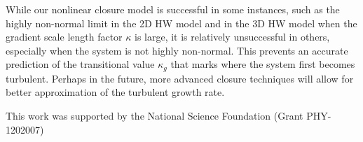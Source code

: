 \documentclass[twocolumn,showkeys,superscriptaddress]{revtex4}
\begin{document}
While our nonlinear closure model is successful in some instances, such as the highly non-normal limit in the 2D HW model and in the 3D HW model when the gradient scale length factor $\kappa$ is large, it is relatively unsuccessful
in others, especially when the system is not highly non-normal. This prevents an accurate prediction of the transitional value $\kappa_g$ that marks where the system first becomes turbulent.
Perhaps in the future, more advanced closure techniques will allow for better approximation of the turbulent growth rate.

\begin{acknowledgments}
This work was supported by the National Science Foundation (Grant PHY-1202007)
\end{acknowledgments}


%

\end{document}
